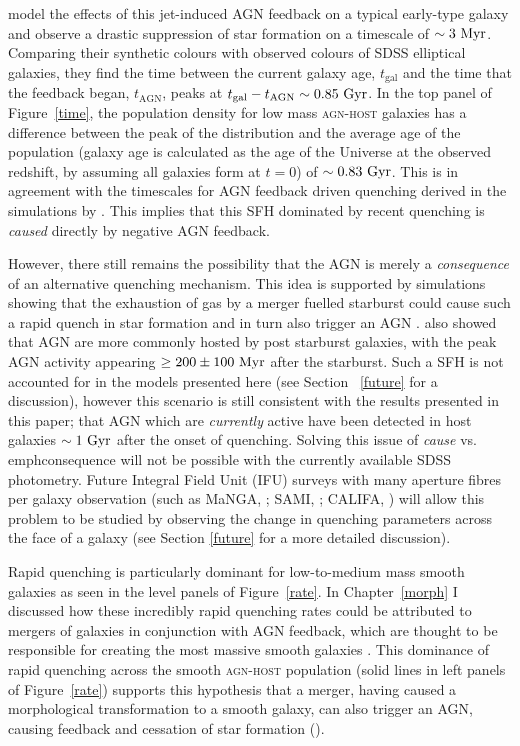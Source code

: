 \cite{tortora09} model the effects of this jet-induced AGN feedback on a typical early-type galaxy and observe a drastic suppression of star formation on a timescale of $\sim 3 ~\rm{Myr}$. Comparing their synthetic colours with observed colours of SDSS elliptical galaxies, they find the time between the current galaxy age, $t_\mathrm{gal}$ and the time that the feedback began, $t_\mathrm{AGN}$, peaks at $t_\mathrm{gal} - t_\mathrm{AGN} \sim 0.85 ~\rm{Gyr}$. In the top panel of Figure~\ref{time}, the population density for low mass \textsc{agn-host} galaxies has a difference between the peak of the distribution and the average age of the population (galaxy age is calculated as the age of the Universe at the observed redshift, by assuming all galaxies form at $t=0$) of $\sim0.83 ~\rm{Gyr}$. This is in agreement with the timescales for AGN feedback driven quenching derived in the simulations by \citet{tortora09}. This implies that this SFH dominated by recent quenching is \emph{caused} directly by negative AGN feedback.

However, there still remains the possibility that the AGN is merely a \emph{consequence} of an alternative quenching mechanism. This idea is supported by simulations showing that the exhaustion of gas by a merger fuelled starburst could cause such a rapid quench in star formation and in turn also trigger an AGN \citep{Croton06, Wild09, Snyder11, Hayward14}. \citet{Yesuf14} also showed that AGN are more commonly hosted by post starburst galaxies, with the peak AGN activity appearing $\geq 200 \pm 100 ~\rm{Myr}$ after the starburst. Such a SFH is not accounted for in the models presented here (see Section ~\ref{future} for a discussion), however this scenario is still consistent with the results presented in this paper; that AGN which are \emph{currently} active have been detected in host galaxies $\sim 1~\rm{Gyr}$ after the onset of quenching. Solving this issue of \emph{cause} vs. emph{consequence} will not be possible with the currently available SDSS photometry. Future Integral Field Unit (IFU) surveys with many aperture fibres per galaxy observation (such as MaNGA, \citealt{bundy15}; SAMI, \citealt{croom12}; CALIFA, \citealt{sanchez12}) will allow this problem to be studied by observing the change in quenching parameters across the face of a galaxy (see Section \ref{future} for a more detailed discussion). 
 
Rapid quenching is particularly dominant for low-to-medium mass smooth galaxies as seen in the level panels of Figure~\ref{rate}. In Chapter~\ref{morph} I discussed how these incredibly rapid quenching rates could be attributed to mergers of galaxies in conjunction with AGN feedback, which are thought to be responsible for creating the most massive smooth galaxies \citep{conselice03b, springel05b, hopkins08b}. This dominance of rapid quenching across the smooth \textsc{agn-host} population (solid lines in left panels of Figure~\ref{rate}) supports this hypothesis that a merger, having caused a morphological transformation to a smooth galaxy, can also trigger an AGN, causing feedback and cessation of star formation (\citealt{Sanders88, pontzen16}).

